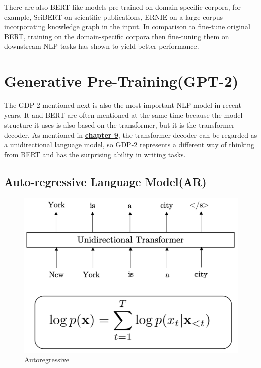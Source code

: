 \documentclass[]{krantz}
\begin{document}
There are also BERT-like models pre-trained on domain-specific corpora, for example, SciBERT \citet{beltagy2019scibert} on scientific publications, ERNIE \citet{zhang2019ernie} on a large corpus incorporating knowledge graph in the input. In comparison to fine-tune original BERT, training on the domain-specific corpora then fine-tuning them on downstream NLP tasks has shown to yield better performance.

\hypertarget{generative-pre-traininggpt-2}{%
\section{Generative Pre-Training(GPT-2)}\label{generative-pre-traininggpt-2}}

The GDP-2 mentioned next is also the most important NLP model in recent years. It and BERT are often mentioned at the same time because the model structure it uses is also based on the transformer, but it is the transformer decoder. As mentioned in \protect\hyperlink{ux5cux2520Attentionux5cux2520andux5cux2520Self-Attentionux5cux2520forux5cux2520NLP}{\textbf{chapter 9}}, the transformer decoder can be regarded as a unidirectional language model, so GDP-2 represents a different way of thinking from BERT and has the surprising ability in writing tasks.

\hypertarget{auto-regressive-language-modelar}{%
\subsection{Auto-regressive Language Model(AR)}\label{auto-regressive-language-modelar}}

\begin{figure}

{\centering \includegraphics[width=0.5\linewidth]{figures/02-03-transfer-learning-for-nlp/autoregressive} 

}

\caption{Autoregressive}\label{fig:ch02-03-figure06}
\end{figure}
\end{document}
